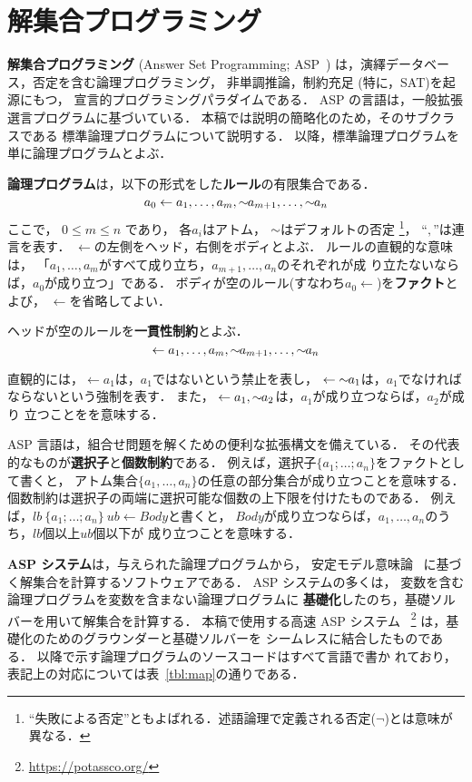 ﻿\section{解集合プログラミング} \label{chap:asp}

\textbf{解集合プログラミング} (Answer Set Programming; ASP~\cite{%
  Baral03:cambridge,%
  Gelfond88:iclp,%
  Inoue08:jssst,%
  Niemela99:amai})
は，演繹データベース，否定を含む論理プログラミング，
非単調推論，制約充足 (特に，SAT)を起源にもつ，
宣言的プログラミングパラダイムである．
ASP の言語は，一般拡張選言プログラムに基づいている．
本稿では説明の簡略化のため，そのサブクラスである
標準論理プログラムについて説明する．
以降，標準論理プログラムを単に論理プログラムとよぶ．

\textbf{論理プログラム}は，以下の形式をした\textbf{ルール}の有限集合である．
\[
  a_0\leftarrow a_1,\dots,a_m,{\sim\!\!{a_{m+1}}},\dots,{\sim\!\!{a_n}}
\]
ここで，
$0\leq m\leq n$ であり，
各$a_i$はアトム，
${\sim\!\!{}}$はデフォルトの否定
\footnote{``失敗による否定''ともよばれる．述語論理で定義される否定($\neg$)とは意味が異なる．}，
``$,$''は連言を表す．
$\leftarrow$の左側をヘッド，右側をボディとよぶ．
ルールの直観的な意味は，
「$a_1,\ldots,a_m$がすべて成り立ち，$a_{m+1},\ldots,a_n$のそれぞれが成
り立たないならば，$a_0$が成り立つ」である．
ボディが空のルール(すなわち\(a_0\leftarrow\))を\textbf{ファクト}とよび，
$\leftarrow$を省略してよい．

ヘッドが空のルールを\textbf{一貫性制約}とよぶ．
\[
  \leftarrow a_1,\dots,a_m,{\sim\!\!{a_{m+1}}},\dots,{\sim\!\!{a_n}}
\]

直観的には，\(\leftarrow a_1\)は，$a_1$ではないという禁止を表し，
\(\leftarrow {\sim\!\!{a_1}}\)は，$a_1$でなければならないという強制を表す．
また，
\(\leftarrow a_1, {\sim\!\!{a_{2}}}\)は，$a_1$が成り立つならば，$a_2$が成り
立つことをを意味する．

ASP 言語は，組合せ問題を解くための便利な拡張構文を備えている．
その代表的なものが\textbf{選択子}と\textbf{個数制約}である．
例えば，選択子\(\{a_1;\dots;a_n\}\)をファクトとして書くと，
アトム集合\(\{a_1,\dots,a_n\}\)の任意の部分集合が成り立つことを意味する．
個数制約は選択子の両端に選択可能な個数の上下限を付けたものである．
例えば，\(lb\ \{a_1;\dots;a_n\}\ ub \leftarrow Body\)と書くと，
$Body$が成り立つならば，$a_1,\dots,a_n$のうち，$lb$個以上$ub$個以下が
成り立つことを意味する．

\textbf{ASP システム}は，与えられた論理プログラムから，
安定モデル意味論~\cite{Gelfond88:iclp}
に基づく解集合を計算するソフトウェアである．
ASP システムの多くは，
変数を含む論理プログラムを変数を含まない論理プログラムに
\textbf{基礎化}したのち，基礎ソルバーを用いて解集合を計算する．
本稿で使用する高速 ASP システム
{\clingo}~\footnote{\url{https://potassco.org/}}
は，基礎化のためのグラウンダー{\gringo}と基礎ソルバー{\clasp}を
シームレスに結合したものである．
以降で示す論理プログラムのソースコードはすべて{\clingo}言語で書か
れており，表記上の対応については表~\ref{tbl:map}の通りである．

